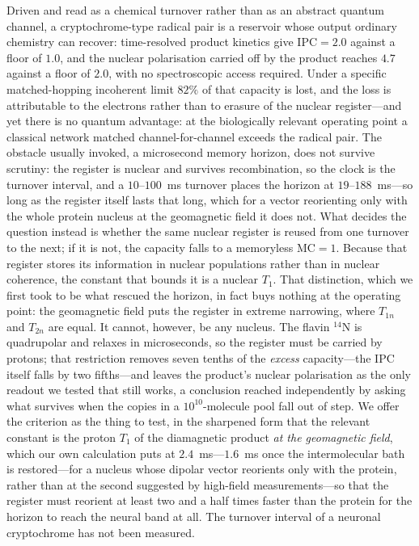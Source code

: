 \documentclass[aps,prx,reprint,superscriptaddress,nofootinbib,floatfix]{revtex4-2}
\begin{document}
Driven and read as a chemical turnover rather than as an abstract quantum channel, a
cryptochrome-type radical pair is a reservoir whose output ordinary chemistry can
recover: time-resolved product kinetics give $\mathrm{IPC}=2.0$ against a floor of
$1.0$, and the nuclear polarisation carried off by the product reaches $4.7$
against a floor of $2.0$, with no spectroscopic access required. Under a specific
matched-hopping incoherent limit $82\%$ of that capacity is lost, and the loss is
attributable to the electrons rather than to erasure of the nuclear register---and
yet there is no quantum advantage: at the biologically relevant operating point a
classical network matched channel-for-channel exceeds the radical pair. The
obstacle usually invoked, a microsecond memory horizon, does not survive scrutiny:
the register is nuclear and survives recombination, so the clock is the turnover
interval, and a $10$--$100$~ms turnover places the horizon at $19$--$188$~ms---so
long as the register itself lasts that long, which for a vector reorienting only with the whole protein
nucleus at the geomagnetic field it does not. What
decides the question instead is whether the same nuclear register is reused from
one turnover to the next; if it is not, the capacity falls to a memoryless
$\mathrm{MC}=1$. Because that register stores its information in nuclear
populations rather than in nuclear coherence, the constant that bounds it is a
nuclear $T_1$. That distinction, which we first took to be what rescued the
horizon, in fact buys nothing at the operating point: the geomagnetic field puts
the register in extreme narrowing, where $T_{1n}$ and $T_{2n}$ are equal. It
cannot, however, be any nucleus. The flavin
$^{14}$N is quadrupolar and relaxes in microseconds, so the register must be
carried by protons; that restriction removes seven tenths of the \emph{excess}
capacity---the IPC itself falls by two fifths---and leaves the product's nuclear
polarisation as the only readout we tested that still works,
a conclusion reached independently by asking what survives when the copies in a
$10^{10}$-molecule pool fall out of step. We offer the criterion as the thing to
test, in the sharpened form that the relevant constant is the proton $T_1$ of the
diamagnetic product \emph{at the geomagnetic field}, which our own calculation
puts at $2.4$~ms---$1.6$~ms once the intermolecular bath is restored---for a
nucleus whose dipolar vector reorients only with the protein, rather than at the second
suggested by high-field measurements---so that the register must reorient at
least two and a half times faster than the protein for the horizon to reach the neural
band at all. The turnover interval of a neuronal cryptochrome has not been
measured.
\end{document}
